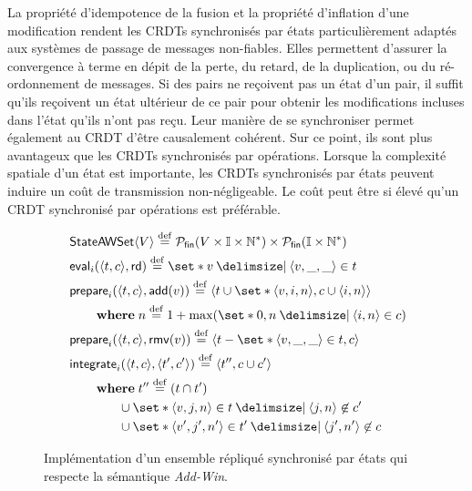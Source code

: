 La propriété d'idempotence de la fusion et la propriété d'inflation d'une modification rendent les \acp{CRDT} synchronisés par états particulièrement adaptés aux systèmes de passage de messages non-fiables.
Elles permettent d'assurer la convergence à terme en dépit de la perte, du retard, de la duplication, ou du ré-ordonnement de messages.
Si des pairs ne reçoivent pas un état d'un pair, il suffit qu'ils reçoivent un état ultérieur de ce pair pour obtenir les modifications incluses dans l'état qu'ils n'ont pas reçu.
Leur manière de se synchroniser permet également au \ac{CRDT} d'être causalement cohérent.
Sur ce point, ils sont plus avantageux que les \acp{CRDT} synchronisés par opérations.
Lorsque la complexité spatiale d'un état est importante, les \acp{CRDT} synchronisés par états peuvent induire un coût de transmission non-négligeable.
Le coût peut être si élevé qu'un \ac{CRDT} synchronisé par opérations est préférable.

\begin{figure}[tb]
\centering
\begin{align}
&\trm{StateAWSet}\tuple*{V} \defeq \powerfset{V \times \mathbb{I} \times \mathbb{N}^*} \times \powerfset{\mathbb{I} \times \mathbb{N}^*} \label{eq:state-awset-state}\\
&\trm{eval}_i(\tuple*{t, c}, \trm{rd}) \defeq \set*{v \given \tuple*{v, \_, \_} \in t} \label{eq:state-awset-eval}\\
&\begin{aligned}
\MoveEqLeft\trm{prepare}_i(\tuple*{t, c}, \trm{add}(v)) \defeq \tuple*{t \cup \set*{\tuple*{v, i, n}},c \cup \tuple*{i, n}}\\
    &\where n \defeq 1 + \max(\set*{0,n \given \tuple*{i, n} \in c})
\end{aligned}\label{eq:state-awset-prep-add}\\
&\trm{prepare}_i(\tuple*{t, c}, \trm{rmv}(v)) \defeq \tuple*{t \sminus \set*{\tuple*{v, \_,\_} \in t},c} \label{eq:state-awset-prep-rmv}\\
&\begin{aligned}
\MoveEqLeft \trm{integrate}_i(\tuple*{t, c}, \tuple*{t', c'}) \defeq \tuple*{t'', c \cup c'}\\
    &\begin{aligned}
    \MoveEqLeft\where t'' \defeq (t \cap t')\\
    &\cup \set*{\tuple*{v, j, n} \in t \given \tuple*{j, n} \not\in c'}\\
    &\cup \set*{\tuple*{v', j', n'} \in t' \given \tuple*{j', n'} \not\in c}
    \end{aligned}
\end{aligned}\label{eq:state-awset-integr}
\end{align}
\caption[Implémentation d'un ensemble répliqué synchronisé par états]{Implémentation d'un ensemble répliqué synchronisé par états qui respecte la sémantique \emph{Add-Win}.}\label{fig:state-add-win-set}
\end{figure}

